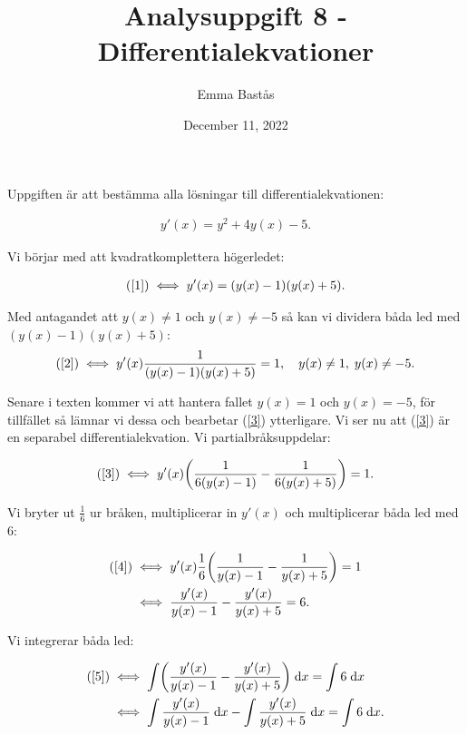 \documentclass{article}
\title{Analysuppgift 8 - Differentialekvationer}
\author{Emma Bastås}
\date{December 11, 2022}
\begin{document}
\maketitle

\noindent Uppgiften är att bestämma alla lösningar till differentialekvationen:

\begin{gather}
  y'(x) = y^{2} + 4y(x) - 5\text{.} \label{1}\tag{$\star$}
\end{gather}

\noindent Vi börjar med att kvadratkomplettera högerledet:

\begin{gather}
  \text{(\ref{1})} \iff y'(x) = (y(x) - 1)(y(x) + 5)\text{.} \label{2}
\end{gather}

\noindent Med antagandet att $y(x) \neq 1$ och $y(x) \neq -5$ så kan vi dividera båda led med $(y(x) - 1)(y(x) + 5)$:
\begin{gather}
  \text{(\ref{2})} \iff y'(x) \frac{1}{(y(x) - 1)(y(x) + 5)} = 1, \quad y(x) \neq 1, \; y(x) \neq -5\text{.} \label{3}
\end{gather}

\noindent Senare i texten kommer vi att hantera fallet $y(x) = 1$ och $y(x) = -5$, för tillfället så lämnar vi dessa och bearbetar (\ref{3}) ytterligare.
Vi ser nu att (\ref{3}) är en separabel differentialekvation. Vi partialbråksuppdelar:

\begin{gather}
  \text{(\ref{3})} \iff y'(x) \biggl( \frac{1}{6(y(x) - 1)} - \frac{1}{6(y(x) + 5)} \biggr) = 1\text{.} \label{4}
\end{gather}

\noindent Vi bryter ut $\tfrac{1}{6}$ ur bråken, multiplicerar in $y'(x)$ och multiplicerar båda led med $6$:

\begin{align}
  \text{(\ref{4})} &\iff y'(x) \frac{1}{6} \biggl(\frac{1}{y(x) - 1} - \frac{1}{y(x) +5} \biggr) = 1 \notag \\
  & \iff \frac{y'(x)}{y(x) - 1} - \frac{y'(x)}{y(x) + 5} = 6\text{.} \label{5}
\end{align}

\noindent Vi integrerar båda led:

\begin{align}
  \text{(\ref{5})} &\iff \int \biggl( \frac{y'(x)}{y(x) - 1} - \frac{y'(x)}{y(x) + 5} \biggr) \;\mathrm{d}x = \int 6 \;\mathrm{d}x \notag \\
  &\iff \int \frac{y'(x)}{y(x) - 1} \;\mathrm{d}x - \int \frac{y'(x)}{y(x) + 5} \;\mathrm{d}x = \int 6 \;\mathrm{d}x\text{.} \label{6}
\end{align}
\end{document}
